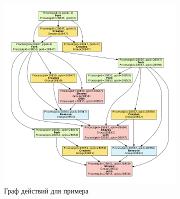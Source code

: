 \begin{figure}[ht!]
	\begin{subfigure}[b]{0.7\textwidth}
		\centering
		\includegraphics[width=\textwidth]{fig/exampleActGraph.pdf}
	\caption{Граф действий для примера}
	\label{chap2:fig:groupsgraph}
	\end{subfigure}
	\begin{subfigure}[b]{0.25\textwidth}
		\centering

\end{subfigure}
\end{figure}
